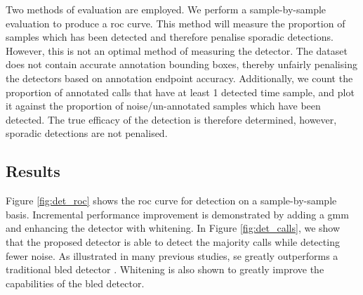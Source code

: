 {Two methods of evaluation are employed. We perform a sample-by-sample evaluation to produce a \ac{roc} curve. This method will measure the proportion of samples which has been detected and therefore penalise sporadic detections. However, this is not an optimal method of measuring the detector. The dataset does not contain accurate annotation bounding boxes, thereby unfairly penalising the detectors based on annotation endpoint accuracy. Additionally, we count the proportion of annotated calls that have at least 1 detected time sample, and plot it against the proportion of noise/un-annotated samples which have been detected. The true efficacy of the detection is therefore determined, however, sporadic detections are not penalised.




\subsection{Results}
\label{sec:detector_results}

Figure \ref{fig:det_roc} shows the \ac{roc} curve for detection on a sample-by-sample basis. Incremental performance improvement is demonstrated by adding a \ac{gmm} and enhancing the detector with whitening. In Figure \ref{fig:det_calls}, we show that the proposed detector is able to detect the majority calls while detecting fewer noise.  As illustrated in many previous studies, \ac{se} greatly outperforms a traditional \ac{bled} detector \citep{se_erbe_king}. Whitening is also shown to greatly improve the capabilities of the \ac{bled} detector.




}
